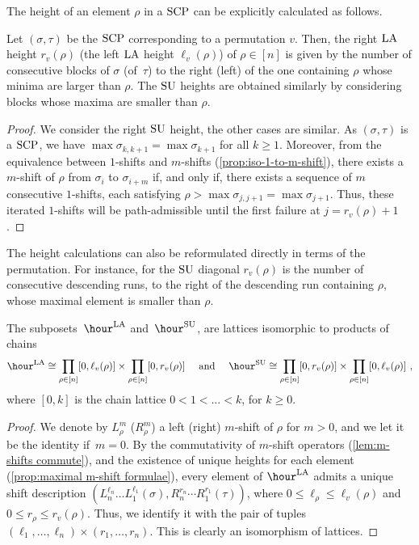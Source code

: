 The height of an element $\rho$ in a $\mathrm{SCP}$ can be explicitly calculated as follows. 

\begin{lemma}
\label{prop:maximal m-shift formulae}
Let $(\sigma,\tau)$ be the $\mathrm{SCP}$ corresponding to a permutation $v$.
Then, the right $\mathrm{LA}$ height $r_v(\rho)$ (\resp the left $\mathrm{LA}$ height $\ell_v(\rho)$) of $\rho \in [n]$ is given by the number of consecutive blocks of $\sigma$ (\resp of~$\tau$) to the right (\resp left) of the one containing $\rho$ whose minima are larger than $\rho$.
The $\mathrm{SU}$ heights are obtained similarly by considering blocks whose maxima are smaller than $\rho$. 
\end{lemma}

\begin{proof}
We consider the right $\mathrm{SU}$ height, the other cases are similar. 
As $(\sigma,\tau)$ is a $\mathrm{SCP}$, we have $\max \sigma_{k,k+1} = \max \sigma_{k+1}$ for all $k\geq 1$. 
Moreover, from the equivalence between $1$-shifts and $m$-shifts (\cref{prop:iso-1-to-m-shift}), there exists a $m$-shift of $\rho$ from $\sigma_i$ to $\sigma_{i+m}$ if, and only if, there exists a sequence of $m$ consecutive $1$-shifts, each satisfying $\rho > \max \sigma_{j,j+1}=\max \sigma_{j+1}$.
Thus, these iterated $1$-shifts will be path-admissible until the first failure at $j=r_v(\rho)+1$.
\end{proof}

\begin{remark}
The height calculations can also be reformulated directly in terms of the permutation.
For instance, for the $\mathrm{SU}$ diagonal $r_v(\rho)$ is the number of consecutive descending runs, to the right of the descending run containing $\rho$, whose maximal element is smaller than $\rho$.
\end{remark}

\begin{proposition} 
\label{prop:shift lattice}
The subposets~$\hour^\LA$ and~$\hour^\SU$, are lattices isomorphic to products of chains
\begin{align*}
\hour^\LA \cong \prod_{\rho \in [n]} [0,\ell_v(\rho)] \times \prod_{\rho \in [n]} [0,r_v(\rho)]
\quad \text{ and } \quad
\hour^\SU \cong \prod_{\rho \in [n]} [0,r_v(\rho)] \times \prod_{\rho \in [n]} [0,\ell_v(\rho)] \ ,
\end{align*}
where $[0,k]$ is the chain lattice $0<1<\dots<k$, for $k\geq 0$.
\end{proposition}

\begin{proof}
We denote by $L_\rho^m$ (\resp $R_\rho^m$) a left (right) $m$-shift of $\rho$ for $m>0$, and we let it be the identity if~$m=0$.
By the commutativity of $m$-shift operators (\cref{lem:m-shifts commute}), and the existence of unique heights for each element (\cref{prop:maximal m-shift formulae}), every element of $\hour^\LA$ admits a unique shift description $(L^{\ell_n}_{n} \dots L^{\ell_1}_{1}(\sigma),
R^{r_n}_{n}\cdots R^{r_{1}}_{1}(\tau))$, where $0\leq \ell_\rho\leq \ell_v(\rho)$ and $0\leq r_\rho\leq r_v(\rho)$.
Thus, we identify it with the pair of tuples $(\ell_1,\ldots,\ell_n)\times (r_1,\ldots,r_n)$.
This is clearly an isomorphism of lattices.
\end{proof}

